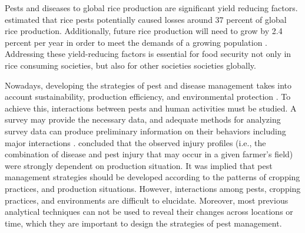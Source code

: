 
Pests and diseases to global rice production are significant yield reducing factors.  estimated that rice pests potentially caused losses around 37 percent of global rice production. Additionally, future rice production will need to grow by 2.4 percent per year in order to meet the demands of a growing population . Addressing these yield-reducing factors is essential for food security not only in rice consuming societies, but also for other societies societies globally.


Nowadays, developing the strategies of pest and disease management takes into account sustainability, production efficiency, and environmental protection \cite{Mew:2004kh}. To achieve this, interactions between pests and human activities must be studied. A survey may provide the necessary data, and adequate methods for analyzing survey data can produce preliminary information on their behaviors including major interactions .  concluded that the observed injury profiles (i.e., the combination of disease and pest injury that may occur in a given farmer’s field) were strongly dependent on production situation. It was implied that pest management strategies should be developed according to the patterns of cropping practices, and production situations. However, interactions among pests, cropping practices, and environments are difficult to elucidate. Moreover, most previous analytical techniques can not be used to reveal their changes across locations or time, which they are important to design the strategies of pest management. 

